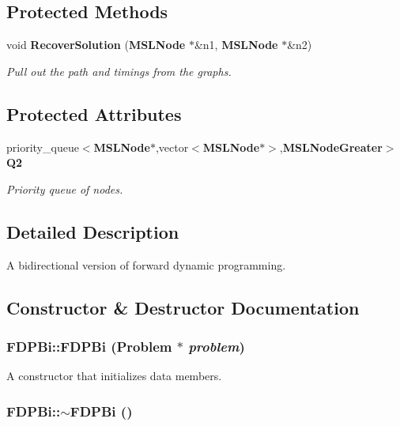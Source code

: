 \subsection*{Protected Methods}
\begin{CompactItemize}
\item 
void {\bf Recover\-Solution} ({\bf MSLNode} $\ast$\&n1, {\bf MSLNode} $\ast$\&n2)
\begin{CompactList}\small\item\em Pull out the path and timings from the graphs.\item\end{CompactList}\end{CompactItemize}
\subsection*{Protected Attributes}
\begin{CompactItemize}
\item 
priority\_\-queue$<${\bf MSLNode}$\ast$,vector$<${\bf MSLNode}$\ast$$>$,{\bf MSLNode\-Greater}$>$ {\bf Q2}
\begin{CompactList}\small\item\em Priority queue of nodes.\item\end{CompactList}\end{CompactItemize}


\subsection{Detailed Description}
A bidirectional version of forward dynamic programming.



\subsection{Constructor \& Destructor Documentation}
\subsubsection{\setlength{\rightskip}{0pt plus 5cm}FDPBi::FDPBi ({\bf Problem} $\ast$ {\em problem})}\label{class_FDPBi_a0}


A constructor that initializes data members.

\subsubsection{\setlength{\rightskip}{0pt plus 5cm}FDPBi::$\sim$FDPBi ()\hspace{0.3cm}{\tt  [inline]}}\label{class_FDPBi_a1}


